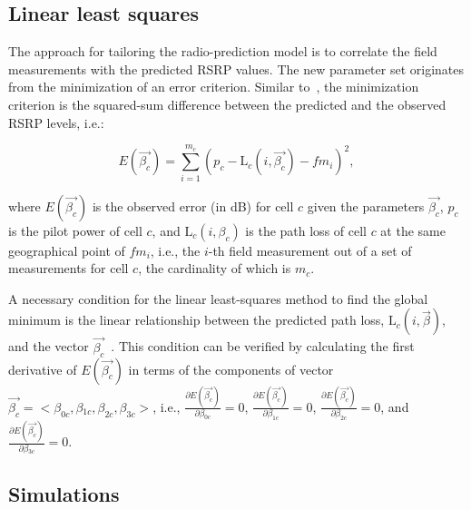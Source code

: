 \subsection{Linear least squares \label{sub:05-Linear_least_squares}}

The approach for tailoring the radio-prediction model is to correlate
the field measurements with the predicted RSRP values. The new parameter
set originates from the minimization of an error criterion. Similar
to~\cite{Aarnaes-Tuning_of_empirical_radio_propagation_models_effect_of_location_accuracy:2004,Huang_Online_propagation_model_correction_based_on_PSO_algorithm_in_LTE_SON_system:2012,Yang_A_linear_least_square_method_of_propagation_model_tuning_for_3G_radion_network_planning:2008},
the minimization criterion is the squared-sum difference between the
predicted and the observed RSRP levels, i.e.:

\begin{equation}
E(\vec{\beta_{c}})=\sum_{i=1}^{m_{c}}(p_{c}-\mathrm{L}{}_{c}(i,\vec{\beta_{c}})-fm_{i})^{2},\label{eq:05-Least_squares_error}
\end{equation}


\noindent where $E(\vec{\beta_{c}})$ is the observed error (in dB)
for cell $c$ given the parameters $\vec{\beta_{c}}$, $p_{c}$ is
the pilot power of cell $c$, and $\mathrm{L}_{c}(i,\beta_{c})$ is
the path loss of cell $c$ at the same geographical point of $fm_{i}$,
i.e., the $i$-th field measurement out of a set of measurements for
cell $c$, the cardinality of which is $m_{c}$.

A necessary condition for the linear least-squares method to find
the global minimum is the linear relationship between the predicted
path loss, $\mathrm{L}{}_{c}(i,\vec{\beta})$, and the vector $\vec{\beta_{c}}$~\cite{Yang_A_linear_least_square_method_of_propagation_model_tuning_for_3G_radion_network_planning:2008}.
This condition can be verified by calculating the first derivative
of $E(\vec{\beta_{c}})$ in terms of the components of vector $\vec{\beta_{c}}=<\beta_{0c},\beta{}_{1c},\beta_{2c},\beta_{3c}>$,
i.e., $\frac{\partial E(\vec{\beta_{c}})}{\partial\beta{}_{0c}}=0$,
$\frac{\partial E(\vec{\beta_{c}})}{\partial\beta_{1c}}=0$, $\frac{\partial E(\vec{\beta_{c}})}{\partial\beta_{2c}}=0$,
and $\frac{\partial E(\vec{\beta_{c}})}{\partial\beta{}_{3c}}=0$.


\subsection{Simulations \label{sub:05-Simulations}}

